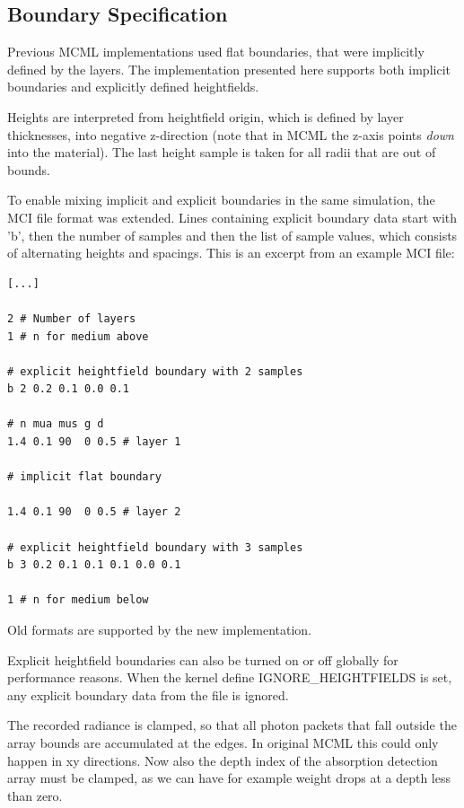 \documentclass[]{article}
\begin{document}
\subsection{Boundary Specification}
\label{impl:boundary_specification}

Previous MCML implementations used flat boundaries, that were implicitly defined by the layers. The implementation presented here supports both implicit boundaries and explicitly defined heightfields.

Heights are interpreted from heightfield origin, which is defined by layer thicknesses, into negative z-direction (note that in MCML the z-axis points \emph{down} into the material). The last height sample is taken for all radii that are out of bounds.

To enable mixing implicit and explicit boundaries in the same simulation, the MCI file format was extended. Lines containing explicit boundary data start with 'b', then the number of samples and then the list of sample values, which consists of alternating heights and spacings. This is an excerpt from an example MCI file:

\begin{lstlisting}
[...]

2 # Number of layers
1 # n for medium above

# explicit heightfield boundary with 2 samples
b 2 0.2 0.1 0.0 0.1

# n mua mus g d
1.4 0.1 90  0 0.5 # layer 1

# implicit flat boundary

1.4 0.1 90  0 0.5 # layer 2

# explicit heightfield boundary with 3 samples
b 3 0.2 0.1 0.1 0.1 0.0 0.1

1 # n for medium below
\end{lstlisting}

Old formats are supported by the new implementation.

Explicit heightfield boundaries can also be turned on or off globally for performance reasons. When the kernel define IGNORE\_HEIGHTFIELDS is set, any explicit boundary data from the file is ignored.

The recorded radiance is clamped, so that all photon packets that fall outside the array bounds are accumulated at the edges. In original MCML this could only happen in xy directions. Now also the depth index of the absorption detection array must be clamped, as we can have for example weight drops at a depth less than zero.
\end{document}
